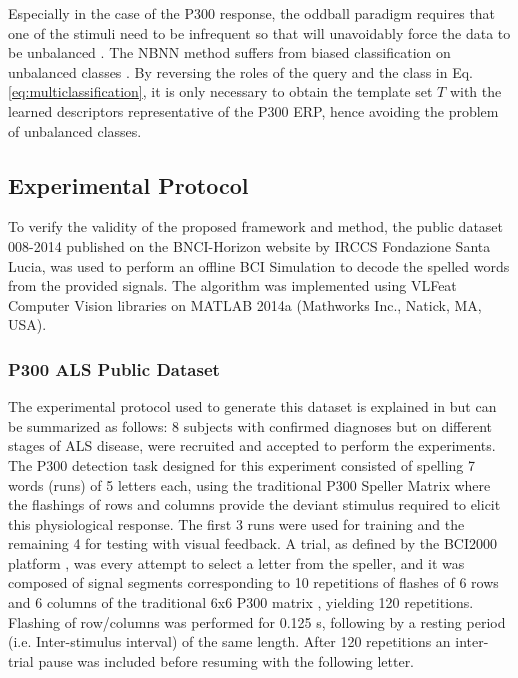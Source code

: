 \documentclass[entropy,article,submit,moreauthors,pdftex,10pt,a4paper]{mdpi}
\begin{document}
Especially in the case of the P300 response, the oddball paradigm requires that one of the stimuli need to be infrequent so that will unavoidably force the data to be unbalanced \citep{Tibon2015}.  The NBNN method suffers from biased classification on unbalanced classes \citep{Fornoni2014}.  By reversing the roles of the query and the class in Eq. \ref{eq:multiclassification}, it is only necessary to obtain the template set $ T $ with the learned descriptors representative of the P300 ERP, hence avoiding the problem of unbalanced classes.



\subsection{Experimental Protocol} \label{Protocol}

To verify the validity of the proposed framework and method, the public dataset 008-2014  \citep{Riccio2013} published on the BNCI-Horizon website \citep{Brunner2014} by  IRCCS Fondazione Santa Lucia, was used to perform an offline BCI Simulation to decode the spelled words from the provided signals.  The algorithm was implemented using  VLFeat  \citep{Vedaldi2010} Computer Vision libraries on MATLAB 2014a (Mathworks Inc., Natick, MA, USA). 

\subsubsection{P300 ALS Public Dataset}

The experimental protocol used to generate this dataset is explained in \citep{Riccio2013} but can be summarized as follows:  8 subjects with confirmed diagnoses but on different stages of ALS disease, were recruited and accepted to perform the experiments. The P300 detection task designed for this experiment consisted of spelling 7 words (runs) of 5 letters each, using the traditional P300 Speller Matrix \citep{Farwell1988} where the flashings of rows and columns provide the deviant stimulus required to elicit this physiological response.  The first 3 runs were used for training and the remaining 4 for testing with visual feedback.  A trial, as defined by the BCI2000 platform \citep{Schalk2004}, was every attempt to select a letter from the speller, and it was composed of signal segments corresponding to 10 repetitions of flashes of 6 rows and 6 columns of the traditional 6x6 P300 matrix , yielding 120 repetitions.  Flashing of row/columns was performed for 0.125 s, following by a resting period (i.e. Inter-stimulus interval) of the same length.  After 120 repetitions an inter-trial pause was included before resuming with the following letter.
\end{document}
